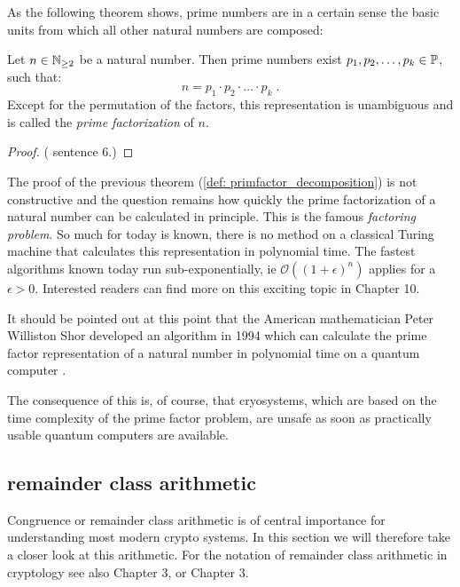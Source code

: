 As the following theorem shows, prime numbers are in a certain sense the basic units from which all other natural numbers are composed:
\begin{theorem}
\label{def: primfactor_decomposition}
Let $ n \in \mathbb{N}_{\geq 2} $ be a natural number. Then prime numbers exist
$ p_1, p_2, \ldots, p_k \in \mathbb{P} $, such that:
\begin{equation}
n = p_1 \cdot p_2 \cdot \ldots \cdot p_k \;.
\end{equation}
Except for the permutation of the factors, this representation is unambiguous and is called the \textit{prime factorization} of $ n $.
\end{theorem}
\begin{proof} (\cite{AL} sentence 6.) 
\end{proof}
\begin{remark}
The proof of the previous theorem (\ref{def: primfactor_decomposition}) is not constructive and the question remains how quickly the prime factorization of a natural number can be calculated in principle. This is the famous \textit{factoring problem}. So much for today is known, there is no method on a classical Turing machine that calculates this representation in polynomial time. The fastest algorithms known today run sub-exponentially, ie $\mathcal{O}((1+ \epsilon)^n)$ applies for a $ \epsilon> 0 $. Interested readers can find more on this exciting topic in \cite{JB} Chapter 10.
\end{remark}
\begin{remark}
It should be pointed out at this point that the American mathematician Peter Williston Shor developed an algorithm in 1994 which can calculate the prime factor representation of a natural number in polynomial time on a quantum computer \cite{PS}.

The consequence of this is, of course, that cryosystems, which are based on the time complexity of the prime factor problem, are unsafe as soon as practically usable quantum computers are available.
\end{remark} 

\subsection{remainder class arithmetic}
Congruence or remainder class arithmetic is of central importance for understanding most modern crypto systems. In this section we will therefore take a closer look at this arithmetic. For the notation of remainder class arithmetic in cryptology see also \cite{JB} Chapter 3, or \cite{AL} Chapter 3.

